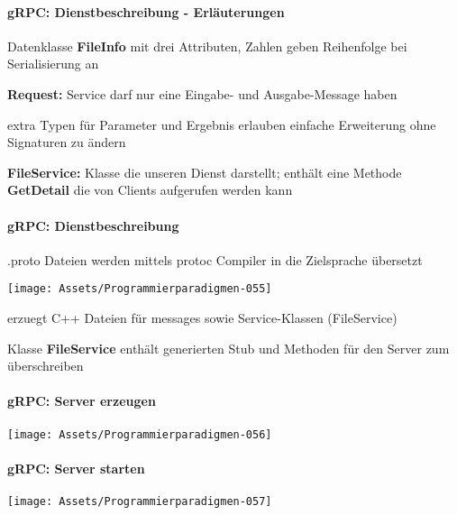 \documentclass[10pt]{article}
\begin{document}
\paragraph{gRPC: Dienstbeschreibung - Erläuterungen}
\begin{itemize*}
  \item Datenklasse \textbf{FileInfo} mit drei Attributen, Zahlen geben Reihenfolge bei Serialisierung an
  \item \textbf{Request:} Service darf nur eine Eingabe- und Ausgabe-Message haben
  \begin{itemize*}
    \item extra Typen für Parameter und Ergebnis erlauben einfache Erweiterung ohne Signaturen zu ändern
  \end{itemize*}
  \item \textbf{FileService:} Klasse die unseren Dienst darstellt; enthält eine Methode \textbf{GetDetail} die von Clients aufgerufen werden kann
\end{itemize*}

\paragraph{gRPC: Dienstbeschreibung}
\begin{itemize*}
  \item *.proto Dateien werden mittels protoc Compiler in die Zielsprache übersetzt
  \begin{center}
    \centering
    \texttt{[image: Assets/Programmierparadigmen-055]}
  \end{center}
  \item erzuegt C++ Dateien für messages sowie Service-Klassen (FileService)
  \item Klasse \textbf{FileService} enthält generierten Stub und  Methoden für den Server zum überschreiben
\end{itemize*}

\paragraph{gRPC: Server erzeugen}
\begin{center}
  \centering
  \texttt{[image: Assets/Programmierparadigmen-056]}
\end{center}

\paragraph{gRPC: Server starten}
\begin{center}
  \centering
  \texttt{[image: Assets/Programmierparadigmen-057]}
\end{center}
\end{document}
